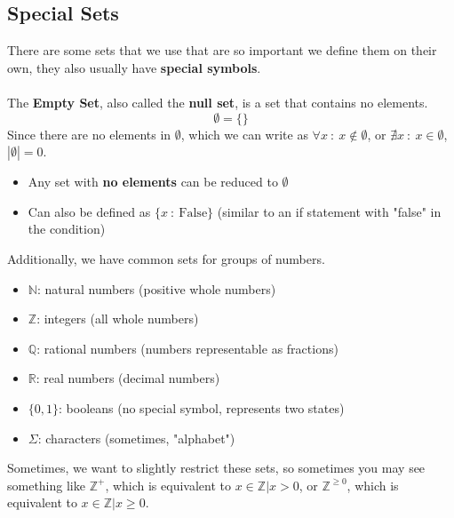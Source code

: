 \documentclass[10pt]{article}
\begin{document}
\subsection*{Special Sets}
There are some sets that we use that are so important we define them on their own, they also usually have \textbf{special symbols}.\\\\
The \textbf{Empty Set}, also called the \textbf{null set}, is a set that contains no elements.
\[\emptyset = \{\}\]
Since there are no elements in $\emptyset$, which we can write as $\forall x \::\: x \notin \emptyset$, or $\nexists x \::\: x \in \emptyset$, $|\emptyset| = 0$.
\begin{itemize}
	\item Any set with \textbf{no elements} can be reduced to $\emptyset$
	\item Can also be defined as $\{x \::\: \text{False}\}$ (similar to an if statement with "false" in the condition)
\end{itemize}
Additionally, we have common sets for groups of numbers.  
\begin{itemize}
	\item $\mathbb{N}$: natural numbers (positive whole numbers)
	\item $\mathbb{Z}$: integers (all whole numbers)
	\item $\mathbb{Q}$: rational numbers (numbers representable as fractions)
	\item $\mathbb{R}$: real numbers (decimal numbers)
	\item $\{0, 1\}$: booleans (no special symbol, represents two states)
	\item $\Sigma$: characters (sometimes, "alphabet")
\end{itemize}
Sometimes, we want to slightly restrict these sets, so sometimes you may see something like $\mathbb{Z}^+$, which is equivalent to $x \in \mathbb{Z} | x > 0$, or $\mathbb{Z}^{\geq 0}$, which is equivalent to $x \in \mathbb{Z}|x \geq 0$.
\end{document}
